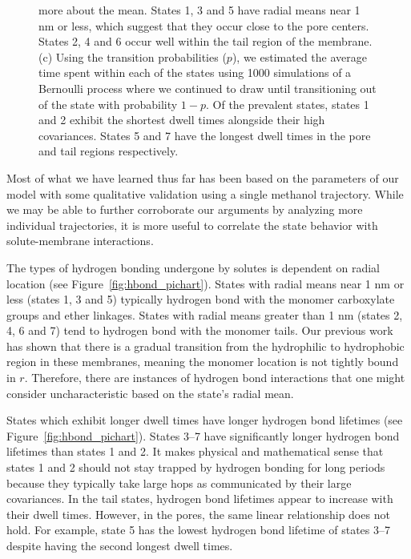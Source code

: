 \documentclass[journal=jpcbfk,manuscript=article]{achemso}
\begin{document}
\begin{figure}
{  more about the mean. States 1, 3 and 5 have radial means near 1 nm or less, which suggest that they
  occur close to the pore centers. States 2, 4 and 6 occur well within the tail region of the membrane.
  (c) Using the transition probabilities ($p$), we estimated the average time spent within each 
  of the states using 1000 simulations of a Bernoulli process where we continued to draw until transitioning
  out of the state with probability $1 - p$. Of the prevalent states, states 1 and 
  2 exhibit the shortest dwell times alongside their high covariances. States 5 and 7 have the longest dwell times in the pore and tail regions respectively.
  }\label{fig:common_states_MET}
  \end{figure}
  
  Most of what we have learned thus far has been based on the parameters of our
  model with some qualitative validation using a single methanol trajectory. While 
  we may be able to further corroborate our arguments by analyzing more
  individual trajectories, it is more useful to correlate the state behavior with
  solute-membrane interactions.

  The types of hydrogen bonding undergone by solutes is dependent on radial
  location (see Figure~\ref{fig:hbond_pichart}). States with radial means near 1 nm
  or less (states 1, 3 and 5) typically hydrogen bond with the monomer carboxylate
  groups and ether linkages. States with radial means greater than 1 nm (states 2,
  4, 6 and 7) tend to hydrogen bond with the monomer tails. 
  Our previous work has
  shown that there is a gradual transition from the hydrophilic to hydrophobic region in
  these membranes, meaning the monomer location is not tightly bound in $r$. 
  Therefore, there are instances of hydrogen bond interactions that one might consider 
  uncharacteristic based on the state's radial mean.

  States which exhibit longer dwell times have longer hydrogen bond lifetimes (see
  Figure~\ref{fig:hbond_pichart}). States 3--7 have significantly longer hydrogen 
  bond lifetimes than states 1 and 2. It makes physical and mathematical sense that
  states 1 and 2 should not stay trapped by hydrogen bonding for long periods because
  they typically take large hops as communicated by their large covariances.
  In the tail states, hydrogen bond lifetimes appear to increase with their dwell 
  times. However, in the pores, the same linear relationship does not hold.
  For example, state 5 has the lowest hydrogen bond lifetime of states 3--7
  despite having the second longest dwell times. 
  
\end{document}
